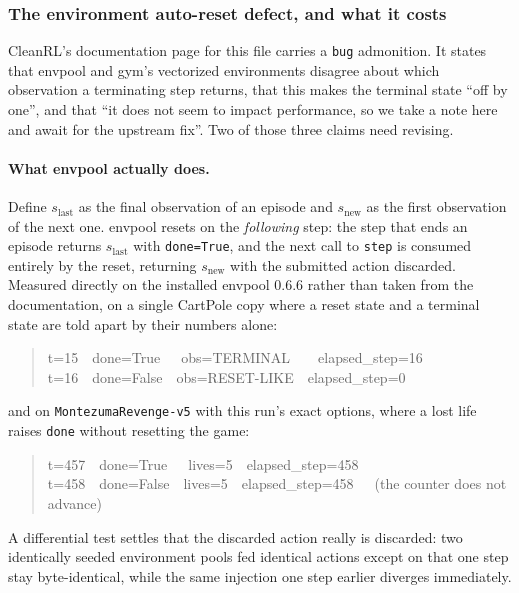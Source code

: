 \subsubsection{The environment auto-reset defect, and what it costs}
\label{sec:cleanrl-bug}

CleanRL's documentation page for this file carries a \texttt{bug} admonition. It states that envpool
and gym's vectorized environments disagree about which observation a terminating step returns, that
this makes the terminal state ``off by one'', and that ``it does not seem to impact performance, so
we take a note here and await for the upstream fix''. Two of those three claims need revising.

\paragraph{What envpool actually does.}
Define $s_{\mathrm{last}}$ as the final observation of an episode and $s_{\mathrm{new}}$ as the first
observation of the next one. envpool resets on the \emph{following} step: the step that ends an
episode returns $s_{\mathrm{last}}$ with \texttt{done=True}, and the next call to \texttt{step} is
consumed entirely by the reset, returning $s_{\mathrm{new}}$ with the submitted action discarded.
Measured directly on the installed envpool $0.6.6$ rather than taken from the documentation, on a
single CartPole copy where a reset state and a terminal state are told apart by their numbers alone:

\begin{quote}\ttfamily\footnotesize\raggedright
t=15\ \ done=True\ \ \ obs=TERMINAL\ \ \ \ elapsed\_step=16\\
t=16\ \ done=False\ \ obs=RESET-LIKE\ \ elapsed\_step=0
\end{quote}

and on \texttt{Montezuma\allowbreak Revenge-v5} with this run's exact options, where a lost life
raises \texttt{done} without resetting the game:

\begin{quote}\ttfamily\footnotesize\raggedright
t=457\ \ done=True\ \ \ lives=5\ \ elapsed\_step=458\\
t=458\ \ done=False\ \ lives=5\ \ elapsed\_step=458\ \ \ (the counter does not advance)
\end{quote}

A differential test settles that the discarded action really is discarded: two identically seeded
environment pools fed identical actions except on that one step stay byte-identical, while the same
injection one step earlier diverges immediately.

